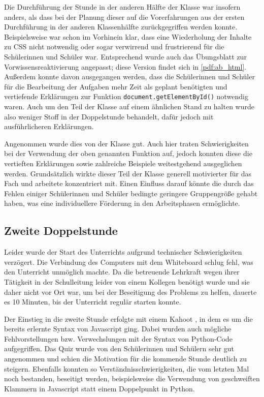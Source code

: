 Die Durchführung der Stunde in der anderen Hälfte der Klasse war insofern anders, als dass bei der Planung dieser auf die Vorerfahrungen aus der ersten Durchführung in der anderen Klassenhälfte zurückgegriffen werden konnte.
Beispielsweise war schon im Vorhinein klar, dass eine Wiederholung der Inhalte zu CSS nicht notwendig oder sogar verwirrend und frustrierend für die Schülerinnen und Schüler war.
Entsprechend wurde auch das Übungsblatt zur Vorwissensreaktivierung angepasst; diese Version findet sich in \autoref{pdf:ab_html}.
Außerdem konnte davon ausgegangen werden, dass die Schülerinnen und Schüler für die Bearbeitung der Aufgaben mehr Zeit als geplant benötigten und vertiefende Erklärungen zur Funktion \texttt{document.getElementById()} notwendig waren.
Auch um den Teil der Klasse auf einem ähnlichen Stand zu halten wurde also weniger Stoff in der Doppelstunde behandelt, dafür jedoch mit ausführlicheren Erklärungen.

Angenommen wurde dies von der Klasse gut.
Auch hier traten Schwierigkeiten bei der Verwendung der oben genannten Funktion auf, jedoch konnten diese die vertieften Erklärungen sowie zahlreiche Beispiele weitestgehend ausgeglichen werden.
Grundsätzlich wirkte dieser Teil der Klasse generell motivierter für das Fach und arbeitete konzentriert mit.
Einen Einfluss darauf könnte die durch das Fehlen einiger Schülerinnen und Schüler bedingte geringere Gruppengröße gehabt haben, was eine individuellere Förderung in den Arbeitsphasen ermöglichte.


\subsection{Zweite Doppelstunde}
\label{subsec:doppelstunde-2}

Leider wurde der Start des Unterrichts aufgrund technischer Schwierigkeiten verzögert.
Die Verbindung des Computers mit dem Whiteboard schlug fehl, was den Unterricht unmöglich machte.
Da die betreuende Lehrkraft wegen ihrer Tätigkeit in der Schulleitung leider von einem Kollegen benötigt wurde und sie daher nicht vor Ort war, um bei der Beseitigung des Problems zu helfen, dauerte es 10 Minuten, bis der Unterricht regulär starten konnte.

Der Einstieg in die zweite Stunde erfolgte mit einem Kahoot \cite{wang2020kahoot, dellos2015kahoot}, in dem es um die bereits erlernte Syntax von Javascript ging.
Dabei wurden auch mögliche Fehlvorstellungen bzw. Verwechslungen mit der Syntax von Python-Code aufgegriffen.
Das Quiz wurde von den Schülerinnen und Schülern sehr gut angenommen und schien die Motivation für die kommende Stunde deutlich zu steigern.
Ebenfalls konnten so Verständnisschwierigkeiten, die vom letzten Mal noch bestanden, beseitigt werden, beispielsweise die Verwendung von geschweiften Klammern in Javascript statt einem Doppelpunkt in Python.

